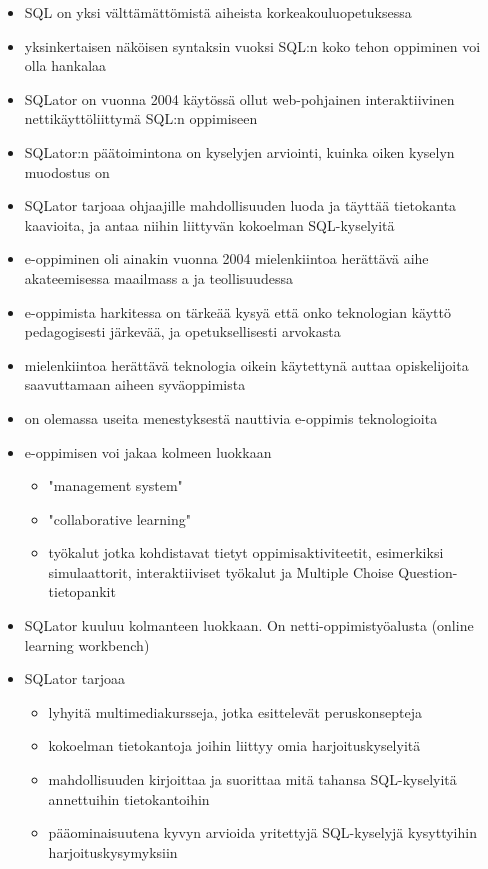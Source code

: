 \begin{itemize}
    \item SQL on yksi välttämättömistä aiheista korkeakouluopetuksessa
    \item yksinkertaisen näköisen syntaksin vuoksi SQL:n koko tehon oppiminen voi olla hankalaa
    \item SQLator on vuonna 2004 käytössä ollut web-pohjainen interaktiivinen nettikäyttöliittymä SQL:n oppimiseen
    \item SQLator:n päätoimintona on kyselyjen arviointi, kuinka oiken kyselyn muodostus on
    \item SQLator tarjoaa ohjaajille mahdollisuuden luoda ja täyttää tietokanta kaavioita, ja antaa niihin liittyvän kokoelman SQL-kyselyitä
    \item e-oppiminen oli ainakin vuonna 2004 mielenkiintoa herättävä aihe akateemisessa maailmass a ja teollisuudessa
    \item e-oppimista harkitessa on tärkeää kysyä että onko teknologian käyttö pedagogisesti järkevää, ja opetuksellisesti arvokasta
    \item mielenkiintoa herättävä teknologia oikein käytettynä auttaa opiskelijoita saavuttamaan aiheen syväoppimista
    \item on olemassa useita menestyksestä nauttivia e-oppimis teknologioita
    \item e-oppimisen voi jakaa kolmeen luokkaan
    \begin{itemize}
        \item "management system"
        \item "collaborative learning"
        \item työkalut jotka kohdistavat tietyt oppimisaktiviteetit, esimerkiksi simulaattorit, interaktiiviset työkalut ja Multiple Choise Question-tietopankit
    \end{itemize}
    \item SQLator kuuluu kolmanteen luokkaan. On netti-oppimistyöalusta (online learning workbench)
    \item SQLator tarjoaa
    \begin{itemize}
        \item lyhyitä multimediakursseja, jotka esittelevät peruskonsepteja
        \item kokoelman tietokantoja joihin liittyy omia harjoituskyselyitä
        \item mahdollisuuden kirjoittaa ja suorittaa mitä tahansa SQL-kyselyitä annettuihin tietokantoihin
        \item pääominaisuutena kyvyn arvioida yritettyjä SQL-kyselyjä kysyttyihin harjoituskysymyksiin

\end{itemize}
\end{itemize}
